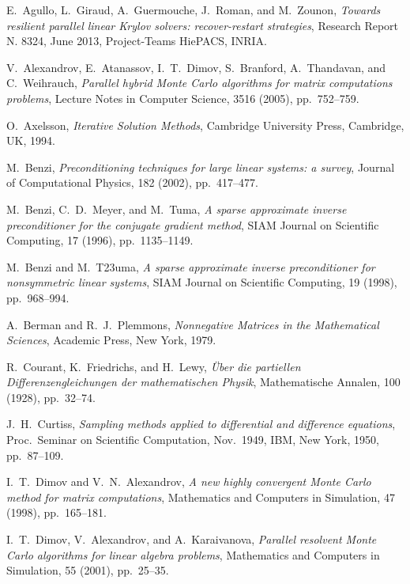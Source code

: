 \documentclass[times]{nlaauth}
\begin{document}
\begin{thebibliography}{99}

  {\sc E.~Agullo, L.~Giraud, A.~Guermouche, J.~Roman, and M.~Zounon},
  {\em Towards resilient parallel linear Krylov solvers: recover-restart
  strategies},
  Research Report N. 8324, June 2013, Project-Teams HiePACS, INRIA.

 {\sc V.~Alexandrov, E.~Atanassov, I.~T.~Dimov, S.~Branford, A.~Thandavan, and
C.~Weihrauch},
{\em Parallel hybrid Monte Carlo algorithms for matrix computations
problems},
Lecture Notes in Computer Science,
3516 (2005), pp.~752--759.

 {\sc O.~Axelsson},
 {\em Iterative Solution Methods},
 Cambridge University Press, Cambridge, UK, 1994.

 {\sc M.~Benzi},
 {\em Preconditioning techniques for large linear systems: a survey},
 Journal of Computational Physics,
 182 (2002), pp.~417--477.

 {\sc M.~Benzi, C.~D.~Meyer, and M.~Tuma},
 {\em A sparse approximate inverse preconditioner for the
 conjugate gradient method},
  SIAM Journal on Scientific Computing,
  17 (1996), pp.~1135--1149.

 {\sc M.~Benzi and M.~T\accent23uma},
 {\em A sparse approximate inverse preconditioner for nonsymmetric linear
systems},
  SIAM Journal on Scientific Computing,
  19 (1998), pp.~968--994.

{\sc A.~Berman and R.~J.~Plemmons},
{\em Nonnegative Matrices in the Mathematical Sciences},
Academic Press, New York, 1979.

{\sc R.~Courant, K.~Friedrichs, and H.~Lewy},
{\em \"Uber die partiellen Differenzengleichungen der mathematischen
Physik}, Mathematische Annalen, 100 (1928), pp.~32--74.

{\sc J.~H.~Curtiss},
{\em Sampling methods applied to differential and difference equations},
Proc.~Seminar on Scientific Computation, Nov.~1949, IBM, New York, 1950, pp.~87--109.

 {\sc I.~T.~Dimov and V.~N.~Alexandrov},
 {\em A new highly convergent Monte Carlo method for matrix computations},
 Mathematics and Computers in Simulation,
 47 (1998), pp.~165--181.

 {\sc I.~T.~Dimov, V.~Alexandrov, and A.~Karaivanova},
 {\em Parallel resolvent Monte Carlo algorithms for linear algebra
 problems},
 Mathematics and Computers in Simulation,
 55 (2001), pp.~25--35.


\end{thebibliography}
\end{document}
